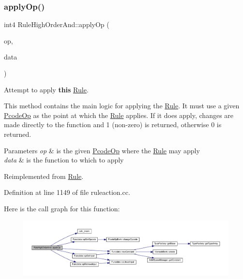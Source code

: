 \subsubsection{\texorpdfstring{applyOp()}{applyOp()}}
{\footnotesize\ttfamily int4 Rule\+High\+Order\+And\+::apply\+Op (\begin{DoxyParamCaption}\item[{\mbox{\hyperlink{class_pcode_op}{Pcode\+Op}} $\ast$}]{op,  }\item[{\mbox{\hyperlink{class_funcdata}{Funcdata}} \&}]{data }\end{DoxyParamCaption})\hspace{0.3cm}{\ttfamily [virtual]}}



Attempt to apply {\bfseries{this}} \mbox{\hyperlink{class_rule}{Rule}}. 

This method contains the main logic for applying the \mbox{\hyperlink{class_rule}{Rule}}. It must use a given \mbox{\hyperlink{class_pcode_op}{Pcode\+Op}} as the point at which the \mbox{\hyperlink{class_rule}{Rule}} applies. If it does apply, changes are made directly to the function and 1 (non-\/zero) is returned, otherwise 0 is returned. 
\begin{DoxyParams}{Parameters}
{\em op} & is the given \mbox{\hyperlink{class_pcode_op}{Pcode\+Op}} where the \mbox{\hyperlink{class_rule}{Rule}} may apply \\
\hline
{\em data} & is the function to which to apply \\
\hline
\end{DoxyParams}


Reimplemented from \mbox{\hyperlink{class_rule_a4e3e61f066670175009f60fb9dc60848}{Rule}}.



Definition at line 1149 of file ruleaction.\+cc.

Here is the call graph for this function\+:
\nopagebreak
\begin{figure}[H]
\begin{center}
\leavevmode
\includegraphics[width=350pt]{class_rule_high_order_and_acadd25bbb252e1619bf2acc6d3b89e2e_cgraph}
\end{center}
\end{figure}
\mbox{\label{class_rule_high_order_and_a467fae8c3fcb0944360aa286fa7a44e9}} 
